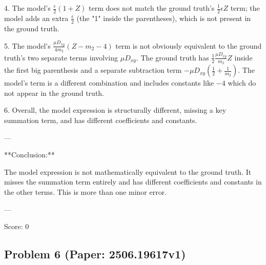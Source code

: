 \documentclass[10pt]{article}
\begin{document}
4. The model's \(\frac{\epsilon}{2}(1 + Z)\) term does not match the ground truth's \(\frac{1}{2} \epsilon Z\) term; the model adds an extra \(\frac{\epsilon}{2}\) (the "1" inside the parentheses), which is not present in the ground truth.

5. The model's \(\frac{\mu D_{xy}}{4 m_2} (Z - m_2 - 4)\) term is not obviously equivalent to the ground truth's two separate terms involving \(\mu D_{xy}\). The ground truth has \(\frac{1}{2} \frac{\mu D_{xy}}{m_2} Z\) inside the first big parenthesis and a separate subtraction term \(- \mu D_{xy} \left( \frac{1}{2} + \frac{1}{m_2} \right)\). The model's term is a different combination and includes constants like \(-4\) which do not appear in the ground truth.

6. Overall, the model expression is structurally different, missing a key summation term, and has different coefficients and constants.

---

**Conclusion:**

The model expression is not mathematically equivalent to the ground truth. It misses the summation term entirely and has different coefficients and constants in the other terms. This is more than one minor error.

---

Score: 0

\newpage
\subsection*{Problem 6 (Paper: 2506.19617v1)}
\end{document}

